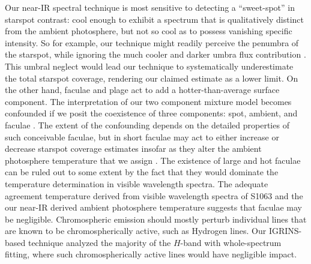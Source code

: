 \documentclass[modern,trackchanges]{aastex631}
\begin{document}
Our near-IR spectral technique is most sensitive to detecting a ``sweet-spot'' in starspot contrast: cool enough to exhibit a spectrum that is qualitatively distinct from the ambient photosphere, but not so cool as to possess vanishing specific intensity.  So for example, our technique might readily perceive the penumbra of the starspot, while ignoring the much cooler and darker umbra flux contribution \citep{1981ApJ...250..327V}.  This umbral neglect would lead our technique to systematically underestimate the total starspot coverage, rendering our claimed estimate as a lower limit.  On the other hand, faculae and plage act to add a hotter-than-average surface component.  The interpretation of our two component mixture model becomes confounded if we posit the coexistence of three components: spot, ambient, and faculae \citep{1998A&A...329..747S}.  The extent of the confounding depends on the detailed properties of such conceivable faculae, but in short faculae may act to either increase or decrease starspot coverage estimates insofar as they alter the ambient photosphere temperature that we assign \citep{2019AJ....157...11W}.  The existence of large and hot faculae can be ruled out to some extent by the fact that they would dominate the temperature determination in visible wavelength spectra.  The adequate agreement temperature derived from visible wavelength spectra of S1063 \citep{mathieu03} and the our near-IR derived ambient photosphere temperature suggests that faculae may be negligible.  Chromospheric emission should mostly perturb individual lines that are known to be chromospherically active, such as Hydrogen lines.  Our IGRINS-based technique analyzed the majority of the $H$-band with whole-spectrum fitting, where such chromospherically active lines would have negligible impact.
\end{document}
